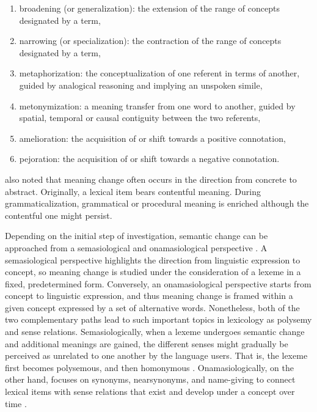 \begin{enumerate}[label={(\arabic*)},nolistsep]
\item broadening (or generalization): the extension of the range of concepts designated by a term, 
\item narrowing (or specialization): the contraction of the range of concepts designated by a term, 
\item metaphorization: the conceptualization of one referent in terms of another, guided by analogical reasoning and implying an unspoken simile, 
\item metonymization: a meaning transfer from one word to another, guided by spatial, temporal or causal contiguity between the two referents, 
\item amelioration: the acquisition of or shift towards a positive connotation, 
\item pejoration: the acquisition of or shift towards a negative connotation.
\end{enumerate}
\vspace*{\baselineskip}


\textcite[81]{traugott2001regularity} also noted that meaning change often occurs in the direction from concrete to abstract. Originally, a lexical item bears contentful meaning. During grammaticalization, grammatical or procedural meaning is enriched although the contentful one might persist.

Depending on the initial step of investigation, semantic change can be approached from a semasiological and onamasiological perspective \parencites[17]{geeraerts1997diachronic}[25]{traugott2001regularity}. A semasiological perspective highlights the direction from linguistic expression to concept, so meaning change is studied under the consideration of a lexeme in a fixed, predetermined form. Conversely, an onamasiological perspective starts from concept to linguistic expression, and thus meaning change is framed within a given concept expressed by a set of alternative words. Nonetheless, both of the two complementary paths lead to such important topics in lexicology as polysemy and sense relations. Semasiologically, when a lexeme undergoes semantic change and additional meanings are gained, the different senses might gradually be perceived as unrelated to one another by the language users. That is, the lexeme first becomes polysemous, and then homonymous \parencite[25]{traugott2001regularity}. Onamasiologically, on the other hand, focuses on synonyms, near­synonyms, and name-­giving to connect lexical items with sense relations that exist and develop under a concept over time \parencite[17]{geeraerts1997diachronic}.


